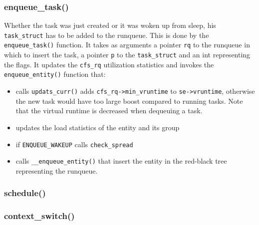 \subsubsection{enqueue\_task()}
Whether the task was just created or it was woken up from sleep, his \verb|task_struct| has to be added to the runqueue. This is done by the \verb|enqueue_task()| function. It takes as arguments a pointer \verb|rq| to the runqueue in which to insert the task, a pointer \verb|p| to the \verb|task_struct| and an int representing the flags. It updates the \verb|cfs_rq| utilization statistics and invokes the \verb|enqueue_entity()| function that:
\begin{itemize}
    \item calls \verb|updats_curr()| adds \verb|cfs_rq->min_vruntime| to \verb|se->vruntime|, otherwise the new task would have too large boost compared to running tasks. Note that the virtual runtime is decreased when dequeuing a task.
    \item updates the load statistics of the entity and its group
    \item if \verb|ENQUEUE_WAKEUP| calls \verb|check_spread|
    \item calls \verb|__enqueue_entity()| that insert the entity in the red-black tree representing the runqueue.
\end{itemize}

\subsubsection{schedule()}

\subsubsection{context\_switch()}

